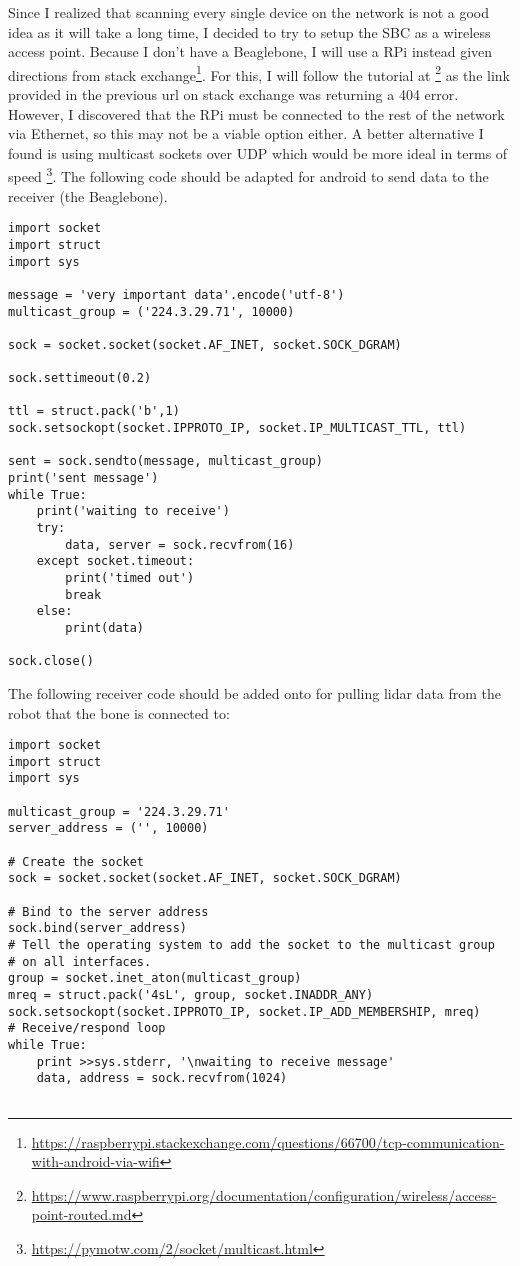 \documentclass[fontsize=11pt, %
                             paper=a4, %
                             twoside, %
                             captions=tableheading,
                             index=totoc,
                             hyperref]{labbook}
\begin{document}
\begin{addmargin}[0cm]{0cm}
Since I realized that scanning every single device on the network is not a good idea as it will take a long time, I decided to try to setup the SBC as a wireless access point. Because I don't have a Beaglebone, I will use a RPi instead given directions from stack exchange\footnote{\url{https://raspberrypi.stackexchange.com/questions/66700/tcp-communication-with-android-via-wifi}}. For this, I will follow the tutorial at \footnote{\url{https://www.raspberrypi.org/documentation/configuration/wireless/access-point-routed.md}} as the link provided in the previous url on stack exchange was returning a 404 error. However, I discovered that the RPi must be connected to the rest of the network via Ethernet, so this may not be a viable option either. A better alternative I found is using multicast sockets over UDP which would be more ideal in terms of speed \footnote{\url{https://pymotw.com/2/socket/multicast.html}}. The following code should be adapted for android to send data to the receiver (the Beaglebone).
\begin{Verbatim}
import socket
import struct
import sys

message = 'very important data'.encode('utf-8')
multicast_group = ('224.3.29.71', 10000)

sock = socket.socket(socket.AF_INET, socket.SOCK_DGRAM)

sock.settimeout(0.2)

ttl = struct.pack('b',1)
sock.setsockopt(socket.IPPROTO_IP, socket.IP_MULTICAST_TTL, ttl)

sent = sock.sendto(message, multicast_group)
print('sent message')
while True:
    print('waiting to receive')
    try:
        data, server = sock.recvfrom(16)
    except socket.timeout:
        print('timed out')
        break
    else:
        print(data)

sock.close()
\end{Verbatim}
The following receiver code should be added onto for pulling lidar data from the robot that the bone is connected to:
\begin{Verbatim}
import socket
import struct
import sys

multicast_group = '224.3.29.71'
server_address = ('', 10000)

# Create the socket
sock = socket.socket(socket.AF_INET, socket.SOCK_DGRAM)

# Bind to the server address
sock.bind(server_address)
# Tell the operating system to add the socket to the multicast group
# on all interfaces.
group = socket.inet_aton(multicast_group)
mreq = struct.pack('4sL', group, socket.INADDR_ANY)
sock.setsockopt(socket.IPPROTO_IP, socket.IP_ADD_MEMBERSHIP, mreq)
# Receive/respond loop
while True:
    print >>sys.stderr, '\nwaiting to receive message'
    data, address = sock.recvfrom(1024)
    

\end{Verbatim}
\end{addmargin}
\end{document}
